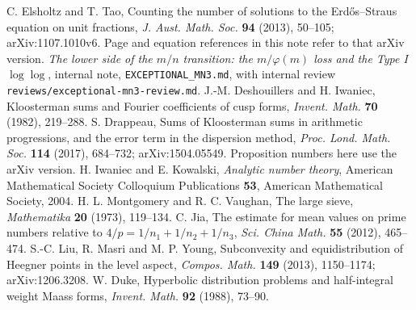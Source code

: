  C. Elsholtz and T. Tao, Counting the number of solutions to the Erd\H{o}s--Straus equation on unit fractions, \emph{J. Aust. Math. Soc.} \textbf{94} (2013), 50--105; arXiv:1107.1010v6. Page and equation references in this note refer to that arXiv version.
 \emph{The lower side of the $m/n$ transition: the $m/\varphi(m)$ loss and the Type I $\log\log$}, internal note, \texttt{EXCEPTIONAL\_MN3.md}, with internal review \texttt{reviews/exceptional-mn3-review.md}.
 J.-M. Deshouillers and H. Iwaniec, Kloosterman sums and Fourier coefficients of cusp forms, \emph{Invent. Math.} \textbf{70} (1982), 219--288.
 S. Drappeau, Sums of Kloosterman sums in arithmetic progressions, and the error term in the dispersion method, \emph{Proc. Lond. Math. Soc.} \textbf{114} (2017), 684--732; arXiv:1504.05549. Proposition numbers here use the arXiv version.
 H. Iwaniec and E. Kowalski, \emph{Analytic number theory}, American Mathematical Society Colloquium Publications \textbf{53}, American Mathematical Society, 2004.
 H. L. Montgomery and R. C. Vaughan, The large sieve, \emph{Mathematika} \textbf{20} (1973), 119--134.
 C. Jia, The estimate for mean values on prime numbers relative to $4/p=1/n_1+1/n_2+1/n_3$, \emph{Sci. China Math.} \textbf{55} (2012), 465--474.
 S.-C. Liu, R. Masri and M. P. Young, Subconvexity and equidistribution of Heegner points in the level aspect, \emph{Compos. Math.} \textbf{149} (2013), 1150--1174; arXiv:1206.3208.
 W. Duke, Hyperbolic distribution problems and half-integral weight Maass forms, \emph{Invent. Math.} \textbf{92} (1988), 73--90.

